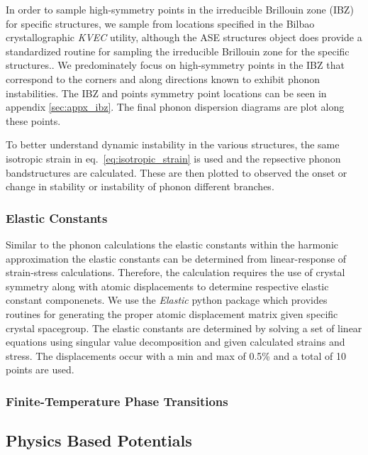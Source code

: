 \documentclass[preprint,colorlinks=true,linkcolor=black,citecolor=black]{elsarticle}
\begin{document}
In order to sample high-symmetry points in the irreducible Brillouin zone (IBZ) for specific structures, we sample from locations specified in the Bilbao crystallographic \textit{KVEC} utility\cite{Aroyo2014}, although the ASE structures object does provide a standardized routine for sampling the irreducible Brillouin zone for the specific structures.\cite{Setyawan2010}. We predominately focus on high-symmetry points in the IBZ that correspond to the corners and along directions known to exhibit phonon instabilities. The IBZ and points symmetry point locations can be seen in appendix \ref{sec:appx_ibz}. The final phonon dispersion diagrams are plot along these points. \par

To better understand dynamic instability in the various structures, the same isotropic strain in eq.~\ref{eq:isotropic_strain} is used and the repsective phonon bandstructures are calculated. These are then plotted to observed the onset or change in stability or instability of phonon different branches. \par

\subsubsection{Elastic Constants}

Similar to the phonon calculations the elastic constants within the harmonic approximation the elastic constants can be determined from linear-response of strain-stress calculations. Therefore, the calculation requires the use of crystal symmetry along with atomic displacements to determine respective elastic constant componenets. We use the \textit{Elastic}\cite{Jochym2018} python package which provides routines for generating the proper atomic displacement matrix given specific crystal spacegroup. The elastic constants are determined by solving a set of linear equations using singular value decomposition and given calculated strains and stress. The displacements occur with a min and max of 0.5\% and a total of 10 points are used. \par

\subsubsection{Finite-Temperature Phase Transitions}

\subsection{Physics Based Potentials}
\label{sec:physics_potentials}
\end{document}
